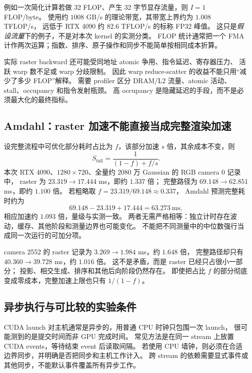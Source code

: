 例如一次简化计算若做 32 FLOP、产生 32 字节显存流量，则 $I=1$ FLOP/byte。
使用约 $1008$ GB/s 的理论带宽，其带宽上界约为 $1.008$ TFLOP/s，
远低于 RTX 4090 约 $82.6$ TFLOP/s 的标称 FP32 峰值。
这只是\emph{假设流量}下的例子，不是对本次 kernel 的实测分类。
FLOP 统计通常把一个 FMA 计作两次运算；指数、排序、原子操作和同步不能简单按相同成本折算。

实际 raster backward 还可能受同地址 atomic 争用、指令延迟、寄存器压力、
活跃 warp 数不足或 warp 分歧限制。
因此 warp reduce-scatter 的收益不能只用“减少了多少 FLOP”解释。
需要 profiler 区分 DRAM/L2 流量、atomic 活动、stall、occupancy 和指令发射瓶颈。
高 occupancy 是隐藏延迟的手段，而不是必须最大化的最终指标。

\subsection{Amdahl：raster 加速不能直接当成完整渲染加速}

设完整流程中可优化部分耗时占比为 $f$，该部分加速 $s$ 倍，其余成本不变，则
\begin{equation}
 S_{\mathrm{full}}=
 \frac{1}{(1-f)+f/s}.
\end{equation}
本次 RTX 4090、$1280\times720$、全量约 2080 万 Gaussian 的 RGB camera 0 记录中，
raster 为 $23.319\to17.444$ ms，即约 $1.337$ 倍；
完整路径为 $69.148\to62.851$ ms，即约 $1.100$ 倍。
若粗略取 $f=23.319/69.148\approx0.337$，
Amdahl 预测完整耗时约为
\begin{equation}
 69.148-23.319+17.444=63.273\ \mathrm{ms},
\end{equation}
相应加速约 $1.093$ 倍，量级与实测一致。
两者无需严格相等：独立计时存在波动，缓存、其他阶段和测量边界也可能变化。
不能把不同测量中的中位数强行当成同一次运行的可加分项。

camera 2552 的 raster 记录为 $3.269\to1.984$ ms，约 $1.648$ 倍，
完整路径却只有 $40.360\to39.728$ ms，约 $1.016$ 倍。
这不是矛盾，而是 raster 已经只占很小一部分；
投影、相交生成、排序和其他后向阶段仍然存在。
即使把占比 $f$ 的部分彻底变成零成本，完整加速上限也只有 $1/(1-f)$。

\subsection{异步执行与可比较的实验条件}

CUDA launch 对主机通常是异步的，用普通 CPU 时钟只包围一次 launch，
很可能测到的是提交时间而非 GPU 完成时间。
常见方法是在同一 stream 上放置 CUDA events，等待结束 event 后读取间隔。
若使用 CPU 墙钟，则必须在合适边界同步，并明确是否把同步和主机工作计入。
跨 stream 的依赖需要显式事件或其他同步，不能默认事件覆盖所有异步工作。

